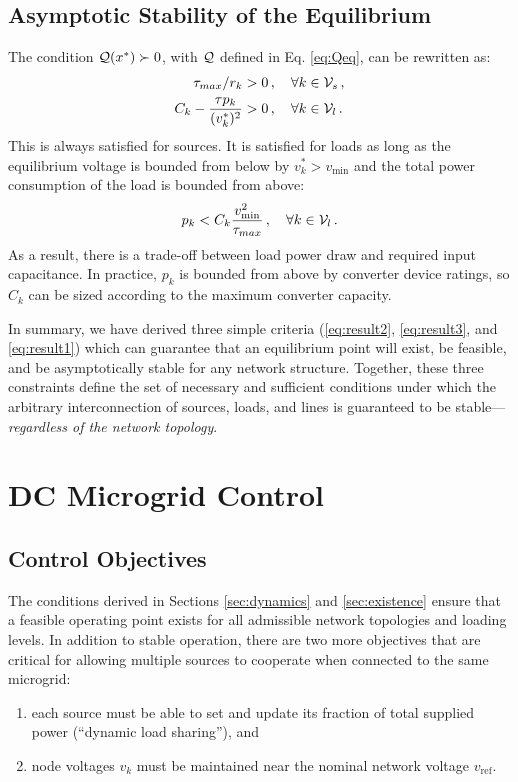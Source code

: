 \documentclass[letterpaper, 10 pt, conference]{ieeeconf}
\begin{document}
\subsection{Asymptotic Stability of the Equilibrium}

The condition ${\cal Q}(x^*) \succ 0$, with ${\cal Q}$ defined in Eq. \eqref{eq:Qeq}, can be rewritten as:
\begin{align}
\tau_{max} / r_k &> 0\,, \quad \forall k \in {\cal V}_s\,, \\
 C_k - \frac{\tau p_k}{(v_k^*)^2} &> 0\,, \quad \forall k \in {\cal V}_l\,.
\end{align}
This is always satisfied for sources. It is satisfied for loads as long as the equilibrium voltage is bounded from below by $v_k^* > v_{\min}$ and the total power consumption of the load is bounded from above:
\begin{equation}\label{eq:result1}
    p_k < C_k \frac{v_{\min}^2}{\tau_{max}}\,, \quad \forall k \in {\cal V}_l\,.
\end{equation}
As a result, there is a trade-off between load power draw and required input capacitance. In practice, $p_k$ is bounded from above by converter device ratings, so $C_k$ can be sized according to the maximum converter capacity.

In summary, we have derived three simple criteria (\eqref{eq:result2}, \eqref{eq:result3}, and \eqref{eq:result1}) which can guarantee that an equilibrium point will exist, be feasible, and be asymptotically stable for any network structure. Together, these three constraints define the set of necessary and sufficient conditions under which the arbitrary interconnection of sources, loads, and lines is guaranteed to be stable---\textit{regardless of the network topology}.

\section{DC Microgrid Control}\label{sec:control}

\subsection{Control Objectives}

The conditions derived in Sections \ref{sec:dynamics} and \ref{sec:existence} ensure that a feasible operating point exists for all admissible network topologies and loading levels. In addition to stable operation, there are two more objectives that are critical for allowing multiple sources to cooperate when connected to the same microgrid:
\begin{enumerate}
    \item each source must be able to set and update its fraction of total supplied power (``dynamic load sharing''), and
    \item node voltages $v_k$ must be maintained near the nominal network voltage $v_{\mathrm{ref}}$.
\end{enumerate}
\end{document}
